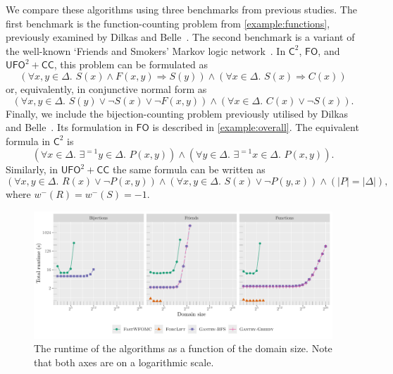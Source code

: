\documentclass[a4paper,UKenglish,cleveref, autoref, thm-restate]{lipics-v2021}
\newcommand{\Ctwo}{$\mathsf{C}^{2}$}
\newcommand{\FO}{$\mathsf{FO}$}
\newcommand{\UFO}{$\mathsf{UFO}^{2} + \mathsf{CC}$}
\newcommand{\Cranetwo}{\textsc{Gantry}}
\begin{document}
We compare these algorithms using three benchmarks from previous studies. The
first benchmark is the function-counting problem from \cref{example:functions},
previously examined by Dilkas and Belle~\cite{DBLP:conf/kr/DilkasB23}. The
second benchmark is a variant of the well-known `Friends and Smokers' Markov
logic network~\cite{DBLP:conf/aaai/SinglaD08,DBLP:conf/uai/BroeckCD12}. In
\Ctwo{}, \FO{}, and \UFO{}, this problem can be formulated as
\[
  (\forall x,y \in \Delta\text{. } S(x) \land F(x, y) \Rightarrow S(y)) \land (\forall x \in \Delta\text{. }S(x) \Rightarrow C(x))
\]
or, equivalently, in conjunctive normal form as
\[
  (\forall x,y \in \Delta\text{. }S(y) \lor \neg S(x) \lor \neg F(x, y)) \land (\forall x \in \Delta\text{. } C(x) \lor \neg S(x)).
\]
Finally, we include the bijection-counting problem previously utilised by Dilkas
and Belle~\cite{DBLP:conf/kr/DilkasB23}. Its formulation in \FO{} is described
in \cref{example:overall}. The equivalent formula in \Ctwo{} is
\[
  (\forall x \in \Delta\text{. }\exists^{=1} y \in \Delta\text{. }P(x, y)) \land (\forall y \in \Delta\text{. }\exists^{=1} x \in \Delta\text{. }P(x, y)).
\]
Similarly, in \UFO{} the same formula can be written as
\[
  (\forall x, y \in \Delta\text{. }R(x) \lor \neg P(x, y)) \land (\forall x, y \in \Delta\text{. }S(x) \lor \neg P(y, x)) \land (|P| = |\Delta|),
\]
where $w^{-}(R) = w^{-}(S) = -1$.

\begin{figure}[t]
  \centering
  \includegraphics{plot.pdf}
  \caption{The runtime of the algorithms as a function of the domain size. Note
    that both axes are on a logarithmic scale.}\label{fig:plot}
\end{figure}


\end{document}

